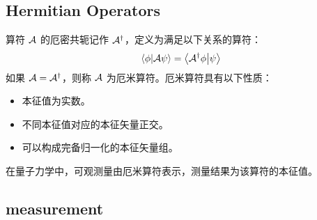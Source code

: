 \subsection{Hermitian Operators}
算符 $\mathcal{A}$ 的厄密共轭记作 $\mathcal{A}^\dagger$，定义为满足以下关系的算符：
\begin{equation}
    \left<\phi\middle|\mathcal{A}\psi\right> = \left<\mathcal{A}^\dagger\phi\middle|\psi\right>
\end{equation}
如果 $\mathcal{A} = \mathcal{A}^\dagger$，则称 $\mathcal{A}$ 为厄米算符。厄米算符具有以下性质：
\begin{itemize}
    \item 本征值为实数。
    \item 不同本征值对应的本征矢量正交。
    \item 可以构成完备归一化的本征矢量组。
\end{itemize}

在量子力学中，可观测量由厄米算符表示，测量结果为该算符的本征值。

\subsection{measurement}

